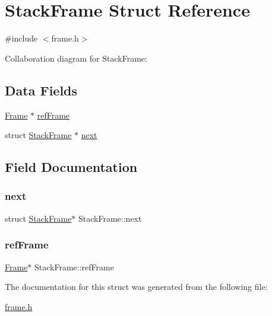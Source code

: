 \hypertarget{structStackFrame}{}\section{Stack\+Frame Struct Reference}
\label{structStackFrame}


{\ttfamily \#include $<$frame.\+h$>$}



Collaboration diagram for Stack\+Frame\+:
\subsection*{Data Fields}
\begin{DoxyCompactItemize}
\item 
\hyperlink{structFrame}{Frame} $\ast$ \hyperlink{structStackFrame_aee414b80c97dcb5e37632a64bbcbff1c}{ref\+Frame}
\item 
struct \hyperlink{structStackFrame}{Stack\+Frame} $\ast$ \hyperlink{structStackFrame_a3cb6ca230d221991df6c9f554aa7a43b}{next}
\end{DoxyCompactItemize}


\subsection{Field Documentation}
\mbox{\label{structStackFrame_a3cb6ca230d221991df6c9f554aa7a43b}} 
\subsubsection{\texorpdfstring{next}{next}}
{\footnotesize\ttfamily struct \hyperlink{structStackFrame}{Stack\+Frame}$\ast$ Stack\+Frame\+::next}

\mbox{\label{structStackFrame_aee414b80c97dcb5e37632a64bbcbff1c}} 
\subsubsection{\texorpdfstring{ref\+Frame}{refFrame}}
{\footnotesize\ttfamily \hyperlink{structFrame}{Frame}$\ast$ Stack\+Frame\+::ref\+Frame}



The documentation for this struct was generated from the following file\+:\begin{DoxyCompactItemize}
\item 
\hyperlink{frame_8h}{frame.\+h}\end{DoxyCompactItemize}
